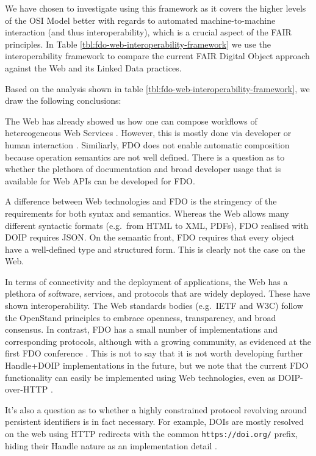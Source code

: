 \documentclass[fleqn,10pt,lineno]{wlpeerj}
\begin{document}
We have chosen to investigate using this framework as it covers the higher levels of the OSI Model \cite{8ZRGFa6y} better with regards to automated machine-to-machine interaction (and thus interoperability), which is a crucial aspect of the FAIR principles. In Table \ref{tbl:fdo-web-interoperability-framework} we use the interoperability framework to compare the current FAIR Digital Object approach against the Web and its Linked Data practices.



Based on the analysis shown in table \ref{tbl:fdo-web-interoperability-framework}, we draw the following conclusions:

The Web has already showed us how one can compose workflows of hetereogeneous Web Services \cite{39K3yHT3}. However, this is mostly done via developer or human interaction \cite{iYh1wFBt}. Similiarly, FDO does not enable automatic composition because operation semantics are not well defined. There is a question as to whether the plethora of documentation and broad developer usage that is available for Web APIs can be developed for FDO.

A difference between Web technologies and FDO is the stringency of the requirements for both syntax and semantics. Whereas the Web allows many different syntactic formats (e.g.~from HTML to XML, PDFs), FDO realised with DOIP requires JSON. On the semantic front, FDO requires that every object have a well-defined type and structured form. This is clearly not the case on the Web.

In terms of connectivity and the deployment of applications, the Web has a plethora of software, services, and protocols that are widely deployed. These have shown interoperability. The Web standards bodies (e.g.~IETF and W3C) follow the OpenStand principles \cite{hxtgCGjY} to embrace openness, transparency, and broad consensus. In contrast, FDO has a small number of implementations and corresponding protocols, although with a growing community, as evidenced at the first FDO conference \cite{jrZe6Esu}. This is not to say that it is not worth developing further Handle+DOIP implementations in the future, but we note that the current FDO functionality can easily be implemented using Web technologies, even as DOIP-over-HTTP \cite{p7nwRj8E}.

It's also a question as to whether a highly constrained protocol revolving around persistent identifiers is in fact necessary. For example, DOIs are mostly resolved on the web \cite{1H9iQhQYq} using HTTP redirects with the common \texttt{https://doi.org/} prefix, hiding their Handle nature as an implementation detail \cite{68fzID2k}.
\end{document}
